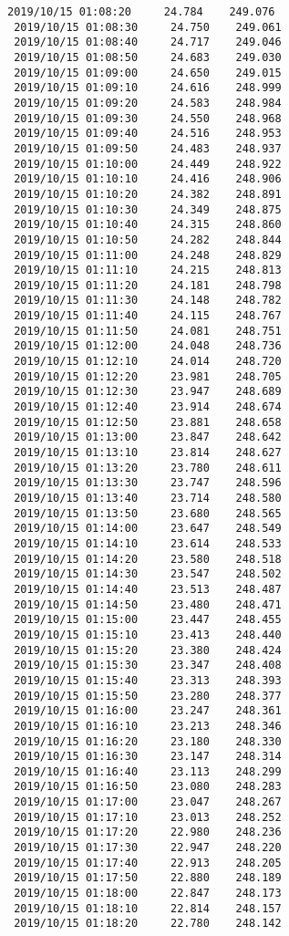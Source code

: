 \documentclass[11pt]{article}
\begin{document}
\begin{Verbatim}[commandchars=\\\{\}]
 2019/10/15 01:08:20     24.784    249.076
 2019/10/15 01:08:30     24.750    249.061
 2019/10/15 01:08:40     24.717    249.046
 2019/10/15 01:08:50     24.683    249.030
 2019/10/15 01:09:00     24.650    249.015
 2019/10/15 01:09:10     24.616    248.999
 2019/10/15 01:09:20     24.583    248.984
 2019/10/15 01:09:30     24.550    248.968
 2019/10/15 01:09:40     24.516    248.953
 2019/10/15 01:09:50     24.483    248.937
 2019/10/15 01:10:00     24.449    248.922
 2019/10/15 01:10:10     24.416    248.906
 2019/10/15 01:10:20     24.382    248.891
 2019/10/15 01:10:30     24.349    248.875
 2019/10/15 01:10:40     24.315    248.860
 2019/10/15 01:10:50     24.282    248.844
 2019/10/15 01:11:00     24.248    248.829
 2019/10/15 01:11:10     24.215    248.813
 2019/10/15 01:11:20     24.181    248.798
 2019/10/15 01:11:30     24.148    248.782
 2019/10/15 01:11:40     24.115    248.767
 2019/10/15 01:11:50     24.081    248.751
 2019/10/15 01:12:00     24.048    248.736
 2019/10/15 01:12:10     24.014    248.720
 2019/10/15 01:12:20     23.981    248.705
 2019/10/15 01:12:30     23.947    248.689
 2019/10/15 01:12:40     23.914    248.674
 2019/10/15 01:12:50     23.881    248.658
 2019/10/15 01:13:00     23.847    248.642
 2019/10/15 01:13:10     23.814    248.627
 2019/10/15 01:13:20     23.780    248.611
 2019/10/15 01:13:30     23.747    248.596
 2019/10/15 01:13:40     23.714    248.580
 2019/10/15 01:13:50     23.680    248.565
 2019/10/15 01:14:00     23.647    248.549
 2019/10/15 01:14:10     23.614    248.533
 2019/10/15 01:14:20     23.580    248.518
 2019/10/15 01:14:30     23.547    248.502
 2019/10/15 01:14:40     23.513    248.487
 2019/10/15 01:14:50     23.480    248.471
 2019/10/15 01:15:00     23.447    248.455
 2019/10/15 01:15:10     23.413    248.440
 2019/10/15 01:15:20     23.380    248.424
 2019/10/15 01:15:30     23.347    248.408
 2019/10/15 01:15:40     23.313    248.393
 2019/10/15 01:15:50     23.280    248.377
 2019/10/15 01:16:00     23.247    248.361
 2019/10/15 01:16:10     23.213    248.346
 2019/10/15 01:16:20     23.180    248.330
 2019/10/15 01:16:30     23.147    248.314
 2019/10/15 01:16:40     23.113    248.299
 2019/10/15 01:16:50     23.080    248.283
 2019/10/15 01:17:00     23.047    248.267
 2019/10/15 01:17:10     23.013    248.252
 2019/10/15 01:17:20     22.980    248.236
 2019/10/15 01:17:30     22.947    248.220
 2019/10/15 01:17:40     22.913    248.205
 2019/10/15 01:17:50     22.880    248.189
 2019/10/15 01:18:00     22.847    248.173
 2019/10/15 01:18:10     22.814    248.157
 2019/10/15 01:18:20     22.780    248.142

\end{Verbatim}
\end{document}
